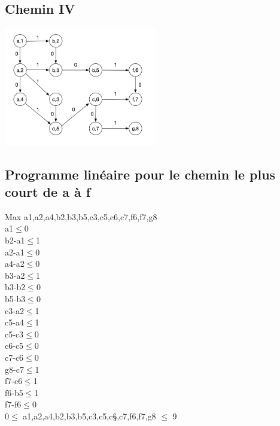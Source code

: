 \documentclass{article}
\begin{document}
\begin{center}
\subsection*{Chemin IV}
\includegraphics[width=0.5\textwidth]{chemin_IV.png}
\end{center}
\subsection*{Programme linéaire pour le chemin le plus court de a à f}

Max a1,a2,a4,b2,b3,b5,c3,c5,c6,c7,f6,f7,g8\\

a1$ \leq $0\\
b2-a1$ \leq $1\\
a2-a1$ \leq $0\\
a4-a2$ \leq $0\\
b3-a2$ \leq $1\\
b3-b2$ \leq $0\\
b5-b3$ \leq $0\\
c3-a2$ \leq $1\\
c5-a4$ \leq $1\\
c5-c3$ \leq $0\\
c6-c5$ \leq $0\\
c7-c6$ \leq $0\\
g8-c7$ \leq $1\\
f7-c6$ \leq $1\\
f6-b5$ \leq $1\\
f7-f6$ \leq $0\\

0$ \leq $ a1,a2,a4,b2,b3,b5,c3,c5,c§,c7,f6,f7,g8 $ \leq $ 9
\end{document}
